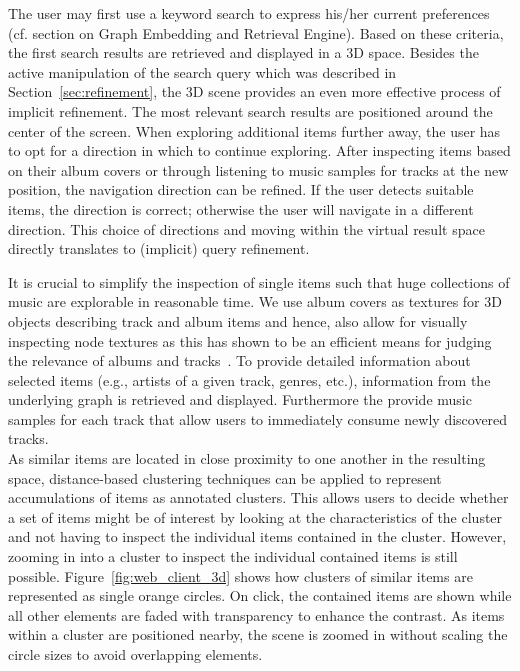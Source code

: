 \documentclass[sigconf]{acmart}
\begin{document}
The user may first use a keyword search to express his/her current preferences (cf. section on Graph Embedding and Retrieval Engine). Based on these criteria, the first search results are retrieved and displayed in a 3D space. Besides the active manipulation of the search query which was described in Section~\ref{sec:refinement}, the 3D scene provides an even more effective process of implicit refinement. The most relevant search results are positioned around the center of the screen. When exploring additional items further away, the user has to opt for a direction in which to continue exploring. After inspecting items based on their album covers or through listening to music samples for tracks at the new position, the navigation direction can be refined. If the user detects suitable items, the direction is correct; otherwise the user will navigate in a different direction. This choice of directions and moving within the virtual result space directly translates to (implicit) query refinement. 


It is crucial to simplify the inspection of single items such that huge collections of music are explorable in reasonable time. We use album covers as textures for 3D objects describing track and album items and hence, also allow for visually inspecting node textures as this has shown to be an efficient means for judging the relevance of albums and tracks~\cite{libeks2011you}. To provide detailed information about selected items (e.g., artists of a given track, genres, etc.), information from the underlying graph is retrieved and displayed. Furthermore the provide music samples for each track that allow users to immediately consume newly discovered tracks. \\

As similar items are located in close proximity to one another in the resulting space, distance-based clustering techniques can be applied to represent accumulations of items as annotated clusters. This allows users to decide whether a set of items might be of interest by looking at the characteristics of the cluster and not having to inspect the individual items contained in the cluster. However, zooming in into a cluster to inspect the individual contained items is still possible. Figure~\ref{fig:web_client_3d} shows how clusters of similar items are represented as single orange circles. On click, the contained items are shown while all other elements are faded with transparency to enhance the contrast. As items within a cluster are positioned nearby, the scene  is zoomed in without scaling the circle sizes to avoid overlapping elements.
\end{document}
